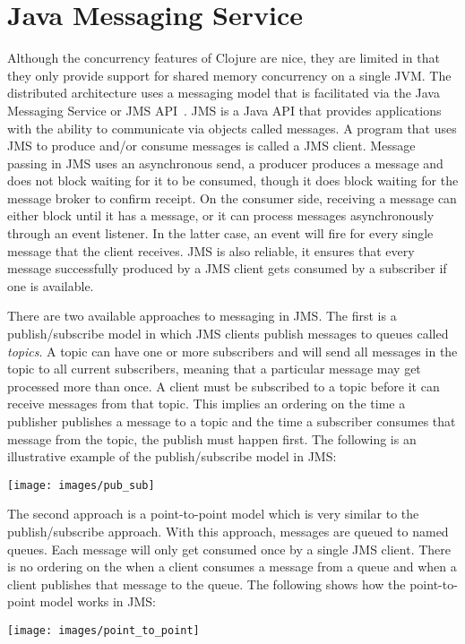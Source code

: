 \section{Java Messaging Service}
Although the concurrency features of Clojure are nice, they are limited in that they only provide support for shared memory concurrency on a single JVM. 
The distributed architecture uses a messaging model that is facilitated via the Java Messaging Service or JMS API~\cite{jms}.
JMS is a Java API that provides applications with the ability to communicate via objects called messages.
A program that uses JMS to produce and/or consume messages is called a JMS client.
Message passing in JMS uses an asynchronous send, a producer produces a message and does not block waiting for it to be consumed, though it does block waiting for the message broker to confirm receipt.
On the consumer side, receiving a message can either block until it has a message, or it can process messages asynchronously through an event listener.
In the latter case, an event will fire for every single message that the client receives.
JMS is also reliable, it ensures that every message successfully produced by a JMS client gets consumed by a subscriber if one is available.

There are two available approaches to messaging in JMS.
The first is a publish/subscribe model in which JMS clients publish messages to queues called {\it topics}.
A topic can have one or more subscribers and will send all messages in the topic to all current subscribers, meaning that a particular message may get processed more than once.
A client must be subscribed to a topic before it can receive messages from that topic.
This implies an ordering on the time a publisher publishes a message to a topic and the time a subscriber consumes that message from the topic, the publish must happen first.
The following is an illustrative example of the publish/subscribe model in JMS:

\texttt{[image: images/pub\_sub]}

The second approach is a point-to-point model which is very similar to the publish/subscribe approach.
With this approach, messages are queued to named queues.
Each message will only get consumed once by a single JMS client.
There is no ordering on the when a client consumes a message from a queue and when a client publishes that message to the queue.
The following shows how the point-to-point model works in JMS:

\texttt{[image: images/point\_to\_point]}


